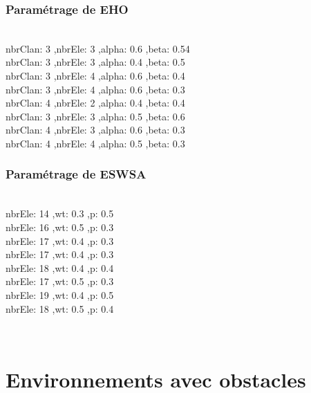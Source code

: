 \noindent
\begin{minipage}[t]{0.55\textwidth}
\subsubsection{Paramétrage de EHO}
\vspace{-0.5cm}
\textbf{}\\
nbrClan: 3 ,nbrEle: 3 ,alpha: 0.6 ,beta: 0.54\\
nbrClan: 3 ,nbrEle: 3 ,alpha: 0.4 ,beta: 0.5\\
nbrClan: 3 ,nbrEle: 4 ,alpha: 0.6 ,beta: 0.4\\
nbrClan: 3 ,nbrEle: 4 ,alpha: 0.6 ,beta: 0.3\\
nbrClan: 4 ,nbrEle: 2 ,alpha: 0.4 ,beta: 0.4\\
nbrClan: 3 ,nbrEle: 3 ,alpha: 0.5 ,beta: 0.6\\
nbrClan: 4 ,nbrEle: 3 ,alpha: 0.6 ,beta: 0.3\\
nbrClan: 4 ,nbrEle: 4 ,alpha: 0.5 ,beta: 0.3
\end{minipage}\hfill
\begin{minipage}[t]{0.4\textwidth}
\subsubsection{Paramétrage de ESWSA}
\vspace{-0.5cm}
\textbf{}\\
nbrEle: 14 ,wt: 0.3 ,p: 0.5\\
nbrEle: 16 ,wt: 0.5 ,p: 0.3\\
nbrEle: 17 ,wt: 0.4 ,p: 0.3\\
nbrEle: 17 ,wt: 0.4 ,p: 0.3\\
nbrEle: 18 ,wt: 0.4 ,p: 0.4\\
nbrEle: 17 ,wt: 0.5 ,p: 0.3\\
nbrEle: 19 ,wt: 0.4 ,p: 0.5\\
nbrEle: 18 ,wt: 0.5 ,p: 0.4 
\end{minipage}\hfill












\textbf{ }\\
\section{Environnements avec obstacles}
